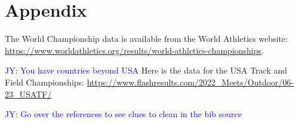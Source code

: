 \documentclass[12pt, letterpaper, titlepage]{article}
\newcommand{\jy}[1]{\textcolor{blue}{JY: #1}}
\begin{document}
\section{Appendix}
\label{sec:Appendix}
The World Championship data is available from the World Athletics website:
\url{https://www.worldathletics.org/results/world-athletics-championships}.

\jy{You have countries beyond USA}
Here is the data for the USA Track and Field Championships: \url{https://www.flashresults.com/2022_Meets/Outdoor/06-23_USATF/}



\jy{Go over the references to see clues to clean in the bib source}


\end{document}
